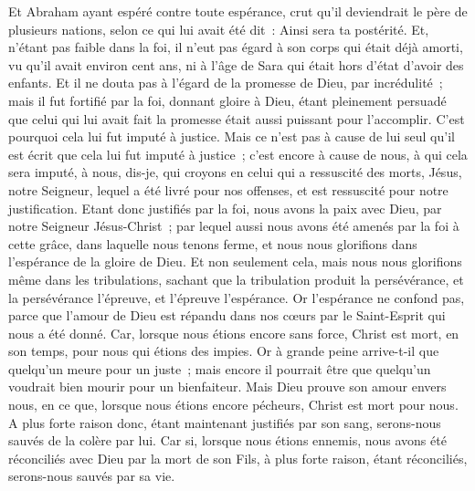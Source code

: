 \begin{multicols}{2}
Et Abraham ayant espéré contre toute espérance, crut qu'il deviendrait le père de plusieurs nations, selon ce qui lui avait été dit~: Ainsi sera ta postérité.
Et, n'étant pas faible dans la foi, il n'eut pas égard à son corps qui était déjà amorti, vu qu'il avait environ cent ans, ni à l'âge de Sara qui était hors d'état d'avoir des enfants.
Et il ne douta pas à l'égard de la promesse de Dieu, par incrédulité~; mais il fut fortifié par la foi, donnant gloire à Dieu,
étant pleinement persuadé que celui qui lui avait fait la promesse était aussi puissant pour l'accomplir.
C'est pourquoi cela lui fut imputé à justice.
Mais ce n'est pas à cause de lui seul qu'il est écrit que cela lui fut imputé à justice~;
c'est encore à cause de nous, à qui cela sera imputé, à nous, dis-je, qui croyons en celui qui a ressuscité des morts, Jésus, notre Seigneur,
lequel a été livré pour nos offenses, et est ressuscité pour notre justification.
\VerseOne{}Etant donc justifiés par la foi, nous avons la paix avec Dieu, par notre Seigneur Jésus-Christ~;
par lequel aussi nous avons été amenés par la foi à cette grâce, dans laquelle nous tenons ferme, et nous nous glorifions dans l'espérance de la gloire de Dieu.
Et non seulement cela, mais nous nous glorifions même dans les tribulations, sachant que la tribulation produit la persévérance,
et la persévérance l'épreuve, et l'épreuve l'espérance.
Or l'espérance ne confond pas, parce que l'amour de Dieu est répandu dans nos cœurs par le Saint-Esprit qui nous a été donné.
Car, lorsque nous étions encore sans force, Christ est mort, en son temps, pour nous qui étions des impies.
Or à grande peine arrive-t-il que quelqu'un meure pour un juste~; mais encore il pourrait être que quelqu'un voudrait bien mourir pour un bienfaiteur.
Mais Dieu prouve son amour envers nous, en ce que, lorsque nous étions encore pécheurs, Christ est mort pour nous.
A plus forte raison donc, étant maintenant justifiés par son sang, serons-nous sauvés de la colère par lui.
Car si, lorsque nous étions ennemis, nous avons été réconciliés avec Dieu par la mort de son Fils, à plus forte raison, étant réconciliés, serons-nous sauvés par sa vie.

\end{multicols}
